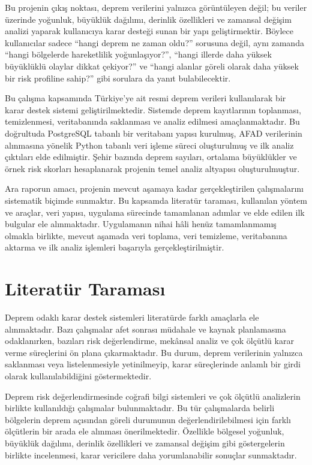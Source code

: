 \documentclass[12pt,a4paper]{report}
\begin{document}
Bu projenin çıkış noktası, deprem verilerini yalnızca görüntüleyen değil; bu veriler üzerinde
yoğunluk, büyüklük dağılımı, derinlik özellikleri ve zamansal değişim analizi yaparak
kullanıcıya karar desteği sunan bir yapı geliştirmektir. Böylece kullanıcılar sadece
``hangi deprem ne zaman oldu?'' sorusuna değil, aynı zamanda ``hangi bölgelerde hareketlilik
yoğunlaşıyor?'', ``hangi illerde daha yüksek büyüklüklü olaylar dikkat çekiyor?'' ve
``hangi alanlar göreli olarak daha yüksek bir risk profiline sahip?'' gibi sorulara da
yanıt bulabilecektir.

Bu çalışma kapsamında Türkiye'ye ait resmi deprem verileri kullanılarak bir karar destek
sistemi geliştirilmektedir. Sistemde deprem kayıtlarının toplanması, temizlenmesi,
veritabanında saklanması ve analiz edilmesi amaçlanmaktadır. Bu doğrultuda PostgreSQL
tabanlı bir veritabanı yapısı kurulmuş, AFAD verilerinin alınmasına yönelik Python tabanlı
veri işleme süreci oluşturulmuş ve ilk analiz çıktıları elde edilmiştir. Şehir bazında
deprem sayıları, ortalama büyüklükler ve örnek risk skorları hesaplanarak projenin temel
analiz altyapısı oluşturulmuştur.

Ara raporun amacı, projenin mevcut aşamaya kadar gerçekleştirilen çalışmalarını sistematik
biçimde sunmaktır. Bu kapsamda literatür taraması, kullanılan yöntem ve araçlar, veri yapısı,
uygulama sürecinde tamamlanan adımlar ve elde edilen ilk bulgular ele alınmaktadır. Uygulamanın
nihai hâli henüz tamamlanmamış olmakla birlikte, mevcut aşamada veri toplama, veri temizleme,
veritabanına aktarma ve ilk analiz işlemleri başarıyla gerçekleştirilmiştir.

\chapter{Literatür Taraması}

Deprem odaklı karar destek sistemleri literatürde farklı amaçlarla ele alınmaktadır.
Bazı çalışmalar afet sonrası müdahale ve kaynak planlamasına odaklanırken, bazıları
risk değerlendirme, mekânsal analiz ve çok ölçütlü karar verme süreçlerini ön plana
çıkarmaktadır. Bu durum, deprem verilerinin yalnızca saklanması veya listelenmesiyle
yetinilmeyip, karar süreçlerinde anlamlı bir girdi olarak kullanılabildiğini
göstermektedir.

Deprem risk değerlendirmesinde coğrafi bilgi sistemleri ve çok ölçütlü analizlerin
birlikte kullanıldığı çalışmalar bulunmaktadır. Bu tür çalışmalarda belirli bölgelerin
deprem açısından göreli durumunun değerlendirilebilmesi için farklı ölçütlerin bir
arada ele alınması önerilmektedir. Özellikle bölgesel yoğunluk, büyüklük dağılımı,
derinlik özellikleri ve zamansal değişim gibi göstergelerin birlikte incelenmesi,
karar vericilere daha yorumlanabilir sonuçlar sunmaktadır.
\end{document}
